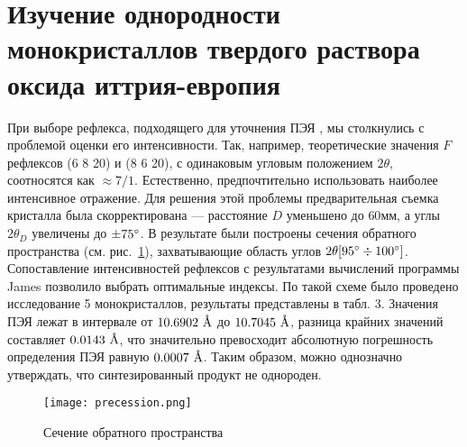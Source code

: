 \section{Изучение однородности монокристаллов твердого раствора оксида иттрия-европия}

При выборе рефлекса, подходящего для уточнения ПЭЯ \YEu{}, мы столкнулись с проблемой оценки его интенсивности.
Так, например, теоретические значения $F$ рефлексов \hkl(6 8 20) и \hkl(8 6 20), с одинаковым угловым положением $2\theta$, соотносятся как $\approx 7/1$.
Естественно, предпочтительно использовать наиболее интенсивное отражение.
Для решения этой проблемы предварительная съемка кристалла была скорректирована --- расстояние $D$ уменьшено до $60\unit{мм}$, а углы $2\theta_D$ увеличены до $\pm 75^\circ$.
В результате были построены сечения обратного пространства (см. рис.~\ref{fig:precession}), захватывающие область углов $2\theta [95^\circ\div100^\circ]$.
Сопоставление интенсивностей рефлексов с результатами вычислений программы James позволило выбрать оптимальные индексы.
По такой схеме было проведено исследование 5 монокристаллов, результаты представлены в табл. 3. Значения ПЭЯ лежат в интервале от $10.6902\ \text{\AA}$ до $10.7045\ \text{\AA}$, разница крайних значений составляет $0.0143\ \text{\AA}$, что значительно превосходит абсолютную погрешность определения ПЭЯ равную $0.0007\ \text{\AA}$.
Таким образом, можно однозначно утверждать, что синтезированный продукт не однороден.

\begin{figure}[ht!]
    \centering
    \texttt{[image: precession.png]}
    \caption{Сечение обратного пространства}%
    \label{fig:precession}
\end{figure}

